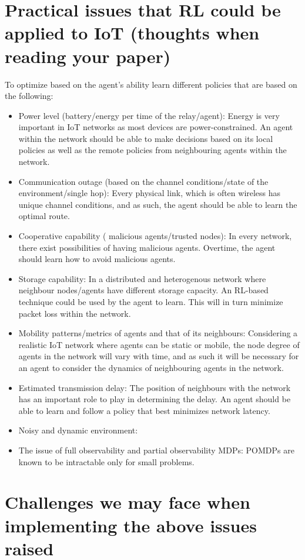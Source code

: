 \documentclass[journal]{IEEEtran}
\begin{document}
\section{Practical issues that RL could be applied to IoT (thoughts when reading your paper)}

To optimize based on the agent's ability learn different policies that are based on the following:
\begin{itemize}
  \item Power level (battery/energy per time of the relay/agent): Energy is very important in IoT networks as most devices are power-constrained. An agent within the network should be able to make decisions based on its local policies as well as the remote policies from neighbouring agents within the network.
  \item Communication outage (based on the channel conditions/state of the environment/single hop): Every physical link, which is often wireless has unique channel conditions, and as such, the agent should be able to learn the optimal route.
  \item Cooperative capability ( malicious agents/trusted nodes): In every network, there exist possibilities of having malicious agents. Overtime, the agent should learn how to avoid malicious agents.
  \item Storage capability: In a distributed and heterogenous network where neighbour nodes/agents have different storage capacity. An RL-based technique could be used by the agent to learn. This will in turn minimize packet loss within the network.
  \item Mobility patterns/metrics of agents and that of its neighbours: Considering a realistic IoT network where agents can be static or mobile, the  node degree of agents in the network will vary with time, and as such it will be necessary for an agent to consider the dynamics of neighbouring agents in the network.
  \item Estimated transmission delay: The position of neighbours with the network has an important role to play in determining the delay. An agent should be able to learn and follow a policy that best minimizes network latency.
  \item Noisy and dynamic environment:
  \item The issue of full observability and partial observability MDPs: POMDPs are known to be intractable only for small problems.
\end{itemize}

\section{Challenges we may face when implementing the above issues raised}
\end{document}
